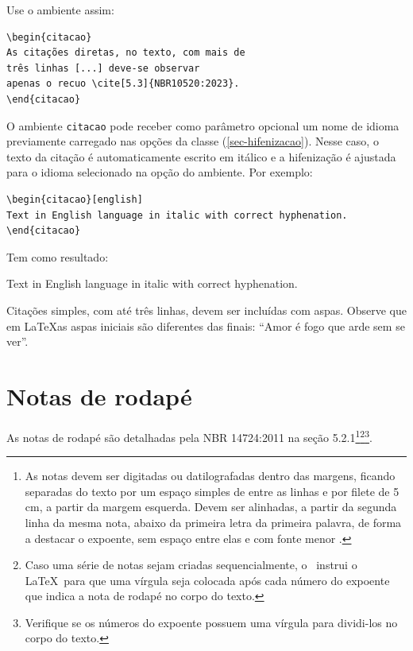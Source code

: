 Use o ambiente assim:

\begin{verbatim}
\begin{citacao}
As citações diretas, no texto, com mais de
três linhas [...] deve-se observar
apenas o recuo \cite[5.3]{NBR10520:2023}.
\end{citacao}
\end{verbatim}

O ambiente \texttt{citacao} pode receber como parâmetro opcional um nome de
idioma previamente carregado nas opções da classe (\autoref{sec-hifenizacao}). Nesse
caso, o texto da citação é automaticamente escrito em itálico e a hifenização é
ajustada para o idioma selecionado na opção do ambiente. Por exemplo:

\begin{verbatim}
\begin{citacao}[english]
Text in English language in italic with correct hyphenation.
\end{citacao}
\end{verbatim}

Tem como resultado:

\begin{citacao}[english]
Text in English language in italic with correct hyphenation.
\end{citacao}

Citações simples, com até três linhas, devem ser
incluídas com aspas. Observe que em \LaTeX as aspas iniciais são diferentes das
finais: ``Amor é fogo que arde sem se ver''.

\section{Notas de rodapé}

As notas de rodapé são detalhadas pela NBR 14724:2011 na seção 5.2.1\footnote{As
notas devem ser digitadas ou datilografadas dentro das margens, ficando
separadas do texto por um espaço simples de entre as linhas e por filete de 5
cm, a partir da margem esquerda. Devem ser alinhadas, a partir da segunda linha
da mesma nota, abaixo da primeira letra da primeira palavra, de forma a destacar
o expoente, sem espaço entre elas e com fonte menor
.}\footnote{Caso uma série de notas sejam
criadas sequencialmente, o \abnTeX\ instrui o \LaTeX\ para que uma vírgula seja
colocada após cada número do expoente que indica a nota de rodapé no corpo do
texto.}\footnote{Verifique se os números do expoente possuem uma vírgula para
dividi-los no corpo do texto.}. 


